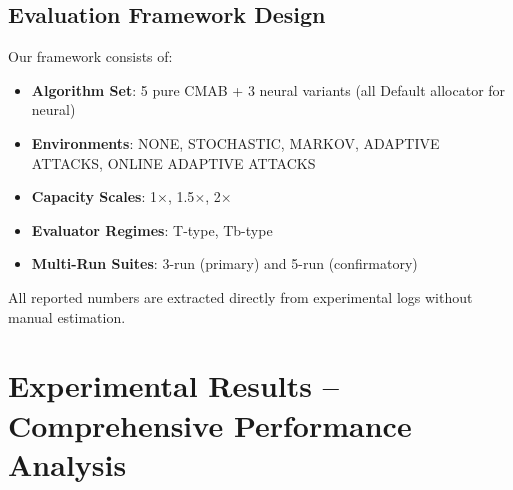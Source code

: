\documentclass[12pt,a4paper]{article}
\begin{document}
\subsection{Evaluation Framework Design}

Our framework consists of:

\begin{itemize}
\item \textbf{Algorithm Set}: 5 pure CMAB + 3 neural variants (all Default allocator for neural)
\item \textbf{Environments}: NONE, STOCHASTIC, MARKOV, ADAPTIVE ATTACKS, ONLINE ADAPTIVE ATTACKS
\item \textbf{Capacity Scales}: 1$\times$, 1.5$\times$, 2$\times$
\item \textbf{Evaluator Regimes}: T-type, Tb-type
\item \textbf{Multi-Run Suites}: 3-run (primary) and 5-run (confirmatory)
\end{itemize}

All reported numbers are extracted directly from experimental logs without manual estimation.

\newpage
\section{Experimental Results – Comprehensive Performance Analysis}
\end{document}
